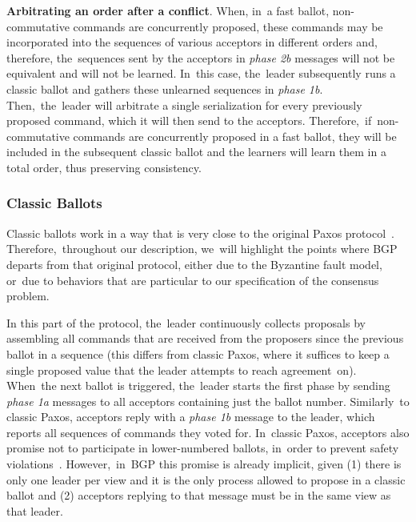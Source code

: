 \documentclass[algorithms,article,accept,moreauthors,pdftex,10pt,a4paper]{Definitions/mdpi}
\begin{document}
{\bf Arbitrating an order after a conflict}. When, in~a fast ballot, non-commutative commands are concurrently proposed, these commands may be incorporated into the sequences of various acceptors in different orders and, therefore, the~sequences sent by the acceptors in \textit{phase 2b} messages will not be equivalent and will not be learned. In~this case, the~leader subsequently runs a classic ballot and gathers these unlearned sequences in \textit{phase 1b}. Then,~the~leader will arbitrate a single serialization for every previously proposed command, which it will then send to the acceptors. Therefore,~if~non-commutative commands are concurrently proposed in a fast ballot, they will be included in the subsequent classic ballot and the learners will learn them in a total order, thus preserving consistency.

\subsubsection{Classic Ballots} 

Classic ballots work in a way that is very close to the original Paxos protocol~\cite{Lam98}. Therefore,~throughout our description, we~will highlight the points where BGP departs from that original protocol, either due to the Byzantine fault model, or~due to behaviors that are particular to our specification of the consensus problem.\par

In this part of the protocol, the~leader continuously collects proposals by assembling all commands that are received from the proposers since the previous ballot in a sequence (this differs from classic Paxos, where it suffices to keep a single proposed value that the leader attempts to reach agreement~on). When~the next ballot is triggered, the~leader starts the first phase by sending \textit{phase 1a} messages to all acceptors containing just the ballot number. Similarly~to classic Paxos, acceptors reply with a \textit{phase 1b} message to the leader, which reports all sequences of commands they voted for. In~classic Paxos, acceptors also promise not to participate in lower-numbered ballots, in~order to prevent safety violations~\cite{Lam98}. However,~in~BGP this promise is already implicit, given (1) there is only one leader per view and it is the only process allowed to propose in a classic ballot and (2) acceptors replying to that message must be in the same view as that leader.
\end{document}
